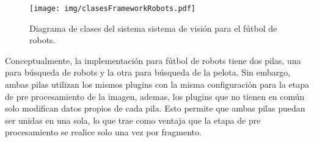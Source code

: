 \begin{figure}[h]

	\texttt{[image: img/clasesFrameworkRobots.pdf]}

	\caption{Diagrama de clases del sistema sistema de visión para el fútbol
	de robots.}

\end{figure}

Conceptualmente, la implementación para fútbol de robots tiene dos pilas, una
para búsqueda de robots y la otra para búsqueda de la pelota. Sin embargo, ambas
pilas utilizan los mismos plugins con la misma configuración para la etapa de
pre procesamiento de la imagen, ademas, los plugins que no tienen en común solo
modifican datos propios de cada pila. Esto permite que ambas pilas puedan ser
unidas en una sola, lo que trae como ventaja que la etapa de pre procesamiento
se realice solo una vez por fragmento.
